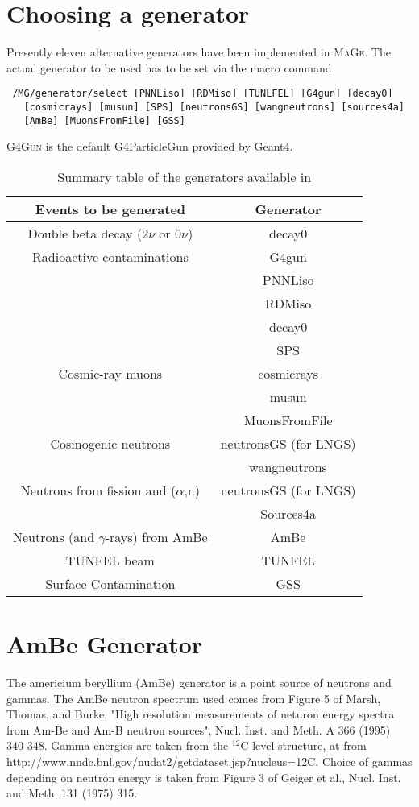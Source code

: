 \section{Choosing a generator}

Presently eleven alternative generators have been implemented in \textsc{MaGe}.
The actual generator to be used has to be set via the macro command

\begin{lstlisting}
 /MG/generator/select [PNNLiso] [RDMiso] [TUNLFEL] [G4gun] [decay0]
   [cosmicrays] [musun] [SPS] [neutronsGS] [wangneutrons] [sources4a]
   [AmBe] [MuonsFromFile] [GSS]
\end{lstlisting}

\textsc{G4Gun} is the default G4ParticleGun provided by Geant4.

\begin{table}[tp]
\caption{Summary table of the generators available in \mage}
\label{Table:generators}
\begin{center}
\begin{tabular}{|c c|}
\hline
Events to be generated & Generator \\
\hline
Double beta decay ($2\nu$ or $0\nu$) & decay0 \\
\hline
Radioactive contaminations & G4gun \\
 & PNNLiso \\
 & RDMiso \\
 & decay0 \\
 & SPS \\
\hline
Cosmic-ray muons & cosmicrays \\
 & musun \\
 & MuonsFromFile \\
\hline
Cosmogenic neutrons & neutronsGS (for LNGS) \\
 & wangneutrons \\
\hline
Neutrons from fission and ($\alpha$,n) & neutronsGS (for LNGS) \\ 
 & Sources4a \\
\hline
Neutrons (and $\gamma$-rays) from AmBe & AmBe \\
\hline
TUNFEL beam & TUNFEL \\
Surface Contamination & GSS \\
\hline
\end{tabular}
\end{center}
\end{table} 

\section{AmBe Generator}
The americium beryllium (AmBe) generator is a point source of neutrons and 
gammas. The AmBe neutron spectrum used comes from Figure 5 of Marsh,
Thomas, and Burke, "High resolution measurements of neturon
energy spectra from Am-Be and Am-B neutron sources", Nucl. Inst.
and Meth. A 366 (1995) 340-348. Gamma energies are taken from the $^{12}$C 
level structure, at
from http://www.nndc.bnl.gov/nudat2/getdataset.jsp?nucleus=12C.
Choice of gammas depending on neutron energy is taken from Figure 3 of 
Geiger et al., Nucl. Inst. and Meth. 131 (1975) 315.
 
